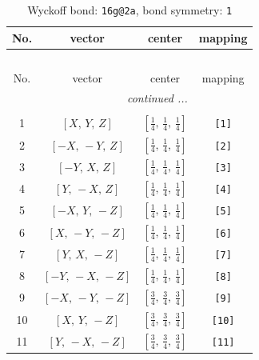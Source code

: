 \documentclass[fleqn,8pt]{jsarticle}
\begin{document}
\begin{longtable}{cccc}
\caption{Wyckoff bond: {\tt 16g@2a}, bond symmetry: {\tt 1}}
 \\
 \hline \hline
No. & vector & center & mapping \\ \hline \endfirsthead

\multicolumn{3}{l}{\tablename\ \thetable{}} \\
 \hline \hline
No. & vector & center & mapping \\ \hline \endhead

 \hline \hline
\multicolumn{3}{r}{\footnotesize\it continued ...} \\ \endfoot

 \hline \hline
\multicolumn{3}{r}{} \\ \endlastfoot

1 & $\left[ X,\, Y,\, Z \right]$ & $\left[ \frac{1}{4},\, \frac{1}{4},\, \frac{1}{4} \right]$ & {\tt [1]} \\ \hline
2 & $\left[ - X,\, - Y,\, Z \right]$ & $\left[ \frac{1}{4},\, \frac{1}{4},\, \frac{1}{4} \right]$ & {\tt [2]} \\ \hline
3 & $\left[ - Y,\, X,\, Z \right]$ & $\left[ \frac{1}{4},\, \frac{1}{4},\, \frac{1}{4} \right]$ & {\tt [3]} \\ \hline
4 & $\left[ Y,\, - X,\, Z \right]$ & $\left[ \frac{1}{4},\, \frac{1}{4},\, \frac{1}{4} \right]$ & {\tt [4]} \\ \hline
5 & $\left[ - X,\, Y,\, - Z \right]$ & $\left[ \frac{1}{4},\, \frac{1}{4},\, \frac{1}{4} \right]$ & {\tt [5]} \\ \hline
6 & $\left[ X,\, - Y,\, - Z \right]$ & $\left[ \frac{1}{4},\, \frac{1}{4},\, \frac{1}{4} \right]$ & {\tt [6]} \\ \hline
7 & $\left[ Y,\, X,\, - Z \right]$ & $\left[ \frac{1}{4},\, \frac{1}{4},\, \frac{1}{4} \right]$ & {\tt [7]} \\ \hline
8 & $\left[ - Y,\, - X,\, - Z \right]$ & $\left[ \frac{1}{4},\, \frac{1}{4},\, \frac{1}{4} \right]$ & {\tt [8]} \\ \hline
9 & $\left[ - X,\, - Y,\, - Z \right]$ & $\left[ \frac{3}{4},\, \frac{3}{4},\, \frac{3}{4} \right]$ & {\tt [9]} \\ \hline
10 & $\left[ X,\, Y,\, - Z \right]$ & $\left[ \frac{3}{4},\, \frac{3}{4},\, \frac{3}{4} \right]$ & {\tt [10]} \\ \hline
11 & $\left[ Y,\, - X,\, - Z \right]$ & $\left[ \frac{3}{4},\, \frac{3}{4},\, \frac{3}{4} \right]$ & {\tt [11]} \\ \hline

\end{longtable}
\end{document}
